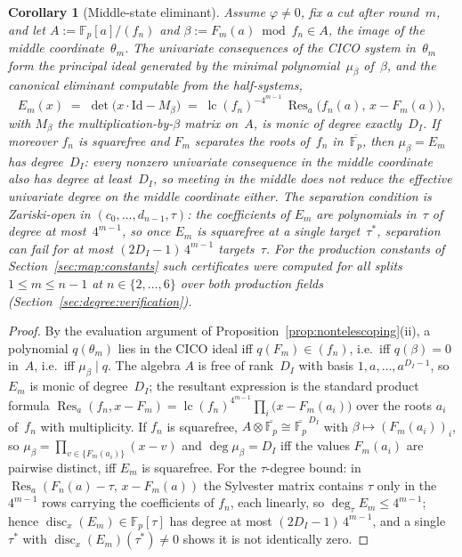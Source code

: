 \documentclass[11pt,a4paper]{article}
\newtheorem{corollary}[theorem]{Corollary}
\theoremstyle{definition}
\newcommand{\Fp}{\mathbb{F}_p}
\begin{document}
\begin{corollary}[Middle-state eliminant]\label{cor:middle_eliminant}
Assume $\varphi \ne 0$, fix a cut after round~$m$, and let
$A := \Fp[a]/(f_n)$ and $\beta := F_m(a) \bmod f_n \in A$, the image
of the middle coordinate~$\theta_m$. The univariate consequences of
the CICO system in~$\theta_m$ form the principal ideal generated by
the minimal polynomial~$\mu_\beta$ of~$\beta$, and the canonical
eliminant computable from the half-systems,
\[
  E_m(x)
   \;=\; \det\bigl(x \cdot \mathrm{Id} - M_\beta\bigr)
   \;=\; \operatorname{lc}(f_n)^{-4^{m-1}}\,
         \operatorname{Res}_a\bigl(f_n(a),\, x - F_m(a)\bigr),
\]
with $M_\beta$ the multiplication-by-$\beta$ matrix on~$A$, is monic
of degree exactly~$D_I$. If moreover $f_n$ is squarefree and $F_m$
separates the roots of~$f_n$ in~$\overline{\Fp}$, then
$\mu_\beta = E_m$ has degree~$D_I$: every nonzero univariate
consequence in the middle coordinate also has degree at
least~$D_I$, so meeting in the middle does not reduce the effective
univariate degree on the middle coordinate either. The separation
condition is Zariski-open in $(c_0, \ldots, d_{n-1}, \tau)$: the
coefficients of $E_m$ are polynomials in~$\tau$ of degree at
most~$4^{m-1}$, so once $E_m$ is squarefree at a single
target~$\tau^{*}$, separation can fail for at most
$(2 D_I - 1)\, 4^{m-1}$ targets~$\tau$. For the production constants
of Section~\ref{sec:map:constants} such certificates were computed
for all splits $1 \le m \le n-1$ at $n \in \{2, \ldots, 6\}$ over
both production fields (Section~\ref{sec:degree:verification}).
\end{corollary}

\begin{proof}
By the evaluation argument of
Proposition~\ref{prop:nontelescoping}(ii), a polynomial
$q(\theta_m)$ lies in the CICO ideal iff $q(F_m) \in (f_n)$, i.e.\
iff $q(\beta) = 0$ in~$A$, i.e.\ iff $\mu_\beta \mid q$. The algebra
$A$ is free of rank~$D_I$ with basis $1, a, \ldots, a^{D_I - 1}$, so
$E_m$ is monic of degree~$D_I$; the resultant expression is the
standard product formula
$\operatorname{Res}_a(f_n, x - F_m)
 = \operatorname{lc}(f_n)^{4^{m-1}} \prod_i \bigl(x - F_m(a_i)\bigr)$
over the roots $a_i$ of~$f_n$ with multiplicity. If $f_n$ is
squarefree, $A \otimes \overline{\Fp} \cong \overline{\Fp}^{\,D_I}$
with $\beta \mapsto (F_m(a_i))_i$, so
$\mu_\beta = \prod_{v \in \{F_m(a_i)\}} (x - v)$ and
$\deg \mu_\beta = D_I$ iff the values $F_m(a_i)$ are pairwise
distinct, iff $E_m$ is squarefree. For the $\tau$-degree bound:
in $\operatorname{Res}_a(F_n(a) - \tau,\, x - F_m(a))$ the Sylvester
matrix contains $\tau$ only in the $4^{m-1}$ rows carrying the
coefficients of $f_n$, each linearly, so
$\deg_\tau E_m \le 4^{m-1}$; hence
$\operatorname{disc}_x(E_m) \in \Fp[\tau]$ has degree at most
$(2 D_I - 1)\, 4^{m-1}$, and a single $\tau^{*}$ with
$\operatorname{disc}_x(E_m)(\tau^{*}) \ne 0$ shows it is not
identically zero.
\end{proof}
\end{document}
